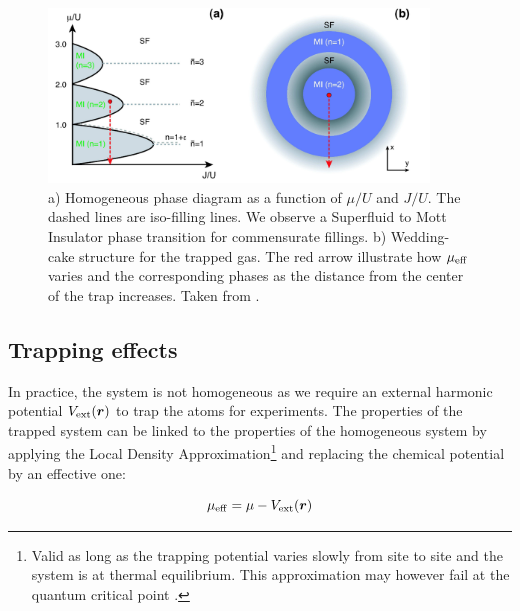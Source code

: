 \begin{figure}
    \centering
    \includegraphics[width=0.9\textwidth]{Fig/Chapter2/mott_lobes.png}
    \caption{a) Homogeneous phase diagram as a function of $\mu/U$ and $J/U$. The dashed lines are iso-filling lines. We observe a Superfluid to Mott Insulator phase transition for commensurate fillings. b) Wedding-cake structure for the trapped gas. The red arrow illustrate how $\mu_{\rm{eff}}$ varies and the corresponding phases as the distance from the center of the trap increases. Taken from \cite{bloch2008many}.}
    \label{fig:mott_lobes}
\end{figure}


\subsection{Trapping effects}

\label{sec:ch2_trapping_effects}

In practice, the system is not homogeneous as we require an external harmonic potential $V_{\rm{ext}}(\bm{r})$ to trap the atoms for experiments. The properties of the trapped system can be linked to the properties of the homogeneous system by applying the Local Density Approximation\footnote{Valid as long as the trapping potential varies slowly from site to site and the system is at thermal equilibrium. This approximation may however fail at the quantum critical point \cite{pollet2012recent}.} \cite{bergkvist2004local} and replacing the chemical potential by an effective one:

\begin{equation}
    \mu_{\rm{eff}}= \mu - V_{\rm{ext}}(\bm{r})
\end{equation}

